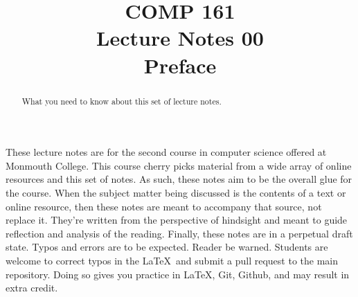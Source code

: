 \documentclass[nobib]{tufte-handout}
\title{COMP 161  \\ Lecture Notes 00 \\ Preface}
\begin{document}
\maketitle

\begin{abstract}
What you need to know about this set of lecture notes.
\end{abstract}

These lecture notes are for the second course in computer science offered at Monmouth College.  This course cherry picks material from a wide array of online resources and this set of notes.  As such, these notes aim to be the overall glue for the course.  When the subject matter being discussed is the contents of a text or online resource, then these notes are meant to accompany that source, not replace it.  They're written from the perspective of hindsight and meant to guide reflection and analysis of the reading.
Finally, these notes are in a perpetual draft state. Typos and errors are to be expected. Reader be warned. Students are welcome to correct typos in the \LaTeX\ and submit a pull request to the main repository. Doing so gives you practice in \LaTeX, Git, Github, and may result in extra credit.
\end{document}
